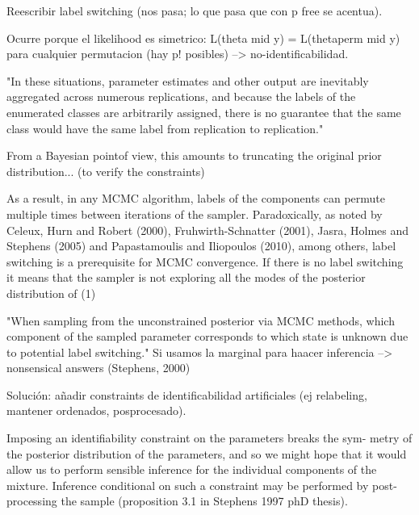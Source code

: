
\begin{outcomment}
Reescribir label switching (nos pasa; lo que pasa que con p free se acentua).

Ocurre porque el likelihood es simetrico: L(theta mid y) = L(thetaperm mid y) para cualquier permutacion (hay p! posibles) --> no-identificabilidad.

"In these situations, parameter estimates and other output are inevitably aggregated
across numerous replications, and because the labels of the enumerated classes are
arbitrarily assigned, there is no guarantee that the same class would have the same
label from replication to replication."

From a Bayesian pointof view, this amounts to truncating the original prior distribution... (to verify the constraints)

As a result, in any MCMC algorithm, labels of the
components can permute multiple times between iterations of the sampler.
Paradoxically, as noted by Celeux, Hurn and Robert (2000), Fruhwirth-Schnatter (2001),
Jasra, Holmes and Stephens (2005) and Papastamoulis and Iliopoulos (2010), among others,
label switching is a prerequisite for MCMC convergence. If there is no label switching it
means that the sampler is not exploring all the modes of the posterior distribution of (1)

"When sampling from the unconstrained posterior via MCMC methods, which component of the sampled parameter corresponds to which state is unknown due to potential label switching." Si usamos la marginal para haacer inferencia --> nonsensical answers (Stephens, 2000)

Solución: añadir constraints de identificabilidad artificiales (ej relabeling, mantener ordenados, posprocesado).

Imposing an identifiability constraint on the parameters breaks the sym-
metry of the posterior distribution of the parameters, and so we might hope that it would allow us to perform sensible inference for the individual components of the mixture. Inference conditional on such a constraint may be performed by post-processing the sample (proposition 3.1 in Stephens 1997 phD thesis).


\end{outcomment}
